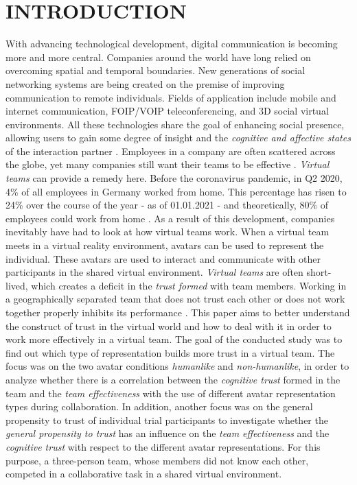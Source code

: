 \documentclass[sigchi]{acmart}
\begin{document}
\maketitle

\section{INTRODUCTION}
With advancing technological development, digital communication is becoming more and more central. Companies around the world have long relied on overcoming spatial and temporal boundaries.
New generations of social networking systems are being created on the premise of improving communication to remote individuals.
Fields of application include mobile and internet communication, FOIP/VOIP teleconferencing, and 3D social virtual environments.
All these technologies share the goal of enhancing social presence, allowing users to gain some degree of insight and the \textit{cognitive and affective states} of the interaction partner \citep{biocca2002defining}.
Employees in a company are often scattered across the globe, yet many companies still want their teams to be effective \citep{jarvenpaa1999communication}. \textit{Virtual teams} can provide a remedy here. 
Before the coronavirus pandemic, in Q2 2020, 4\% of all employees in Germany worked from home. This percentage has risen to 24\% over the course of the year - as of 01.01.2021 - and theoretically, 80\% of employees could work from home \citep{statistaCorona2020}. As a result of this development, companies inevitably have had to look at how virtual teams work.
When a virtual team meets in a virtual reality environment, avatars can be used to represent the individual. These avatars are used to interact and communicate with other participants in the shared virtual environment.
\textit{Virtual teams} are often short-lived, which creates a deficit in the \textit{trust formed} with team members.
Working in a geographically separated team that does not trust each other or does not work together properly inhibits its performance \citep{huang1998supporting} \citep{turoff1993distributed}. This paper aims to better understand the construct of trust in the virtual world and how to deal with it in order to work more effectively in a virtual team.
The goal of the conducted study was to find out which type of representation builds more trust in a virtual team. The focus was on the two avatar conditions \textit{humanlike} and \textit{non-humanlike}, in order to analyze whether there is a correlation between the \textit{cognitive trust} formed in the team and the \textit{team effectiveness} with the use of different avatar representation types during collaboration.
In addition, another focus was on the general propensity to trust of individual trial participants to investigate whether the \textit{general propensity to trust} has an influence on the \textit{team effectiveness} and the \textit{cognitive trust} with respect to the different avatar representations. For this purpose, a three-person team, whose members did not know each other, competed in a collaborative task in a shared virtual environment.
\end{document}
